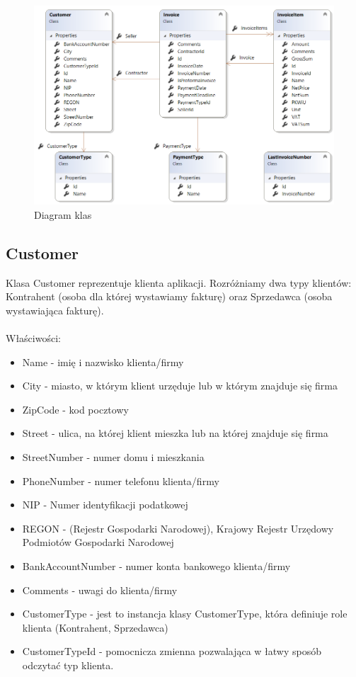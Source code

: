 \begin{figure}[ht!]
  \includegraphics[width=\linewidth]{Rysunki/ClassDiagram.png}
  \caption{Diagram klas}
  \label{fig:classDiagram}
\end{figure}

\subsection{Customer}
Klasa Customer reprezentuje klienta aplikacji. Rozróżniamy dwa typy klientów: Kontrahent (osoba dla której wystawiamy fakturę) oraz Sprzedawca (osoba wystawiająca fakturę).
\\\\
Właściwości:
\begin{itemize}
    \item Name - imię i nazwisko klienta/firmy
    \item City - miasto, w którym klient urzęduje lub w którym znajduje się firma
    \item ZipCode - kod pocztowy
    \item Street - ulica, na której klient mieszka lub na której znajduje się firma
    \item StreetNumber - numer domu i mieszkania
    \item PhoneNumber - numer telefonu klienta/firmy
    \item NIP - Numer identyfikacji podatkowej
    \item REGON - (Rejestr Gospodarki Narodowej), Krajowy Rejestr Urzędowy Podmiotów Gospodarki Narodowej
    \item BankAccountNumber - numer konta bankowego klienta/firmy
    \item Comments - uwagi do klienta/firmy
    \item CustomerType - jest to instancja klasy CustomerType, która definiuje role klienta (Kontrahent, Sprzedawca)
    \item CustomerTypeId - pomocnicza zmienna pozwalająca w łatwy sposób odczytać typ klienta.
\end{itemize}

